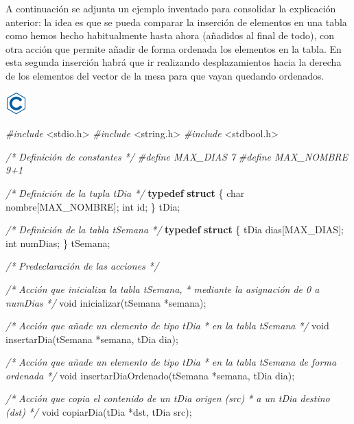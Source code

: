 \documentclass[
]{book}
\newenvironment{Shaded}{\begin{snugshade}}{\end{snugshade}}
\newcommand{\CommentTok}[1]{\textcolor[rgb]{0.56,0.35,0.01}{\textit{#1}}}
\newcommand{\DataTypeTok}[1]{\textcolor[rgb]{0.13,0.29,0.53}{#1}}
\newcommand{\ImportTok}[1]{#1}
\newcommand{\KeywordTok}[1]{\textcolor[rgb]{0.13,0.29,0.53}{\textbf{#1}}}
\newcommand{\NormalTok}[1]{#1}
\newcommand{\PreprocessorTok}[1]{\textcolor[rgb]{0.56,0.35,0.01}{\textit{#1}}}
\begin{document}
A continuación se adjunta un ejemplo inventado para consolidar la explicación anterior: la idea es que se pueda comparar la inserción de elementos en una tabla como hemos hecho habitualmente hasta ahora (añadidos al final de todo), con otra acción que permite añadir de forma ordenada los elementos en la tabla. En esta segunda inserción habrá que ir realizando desplazamientos hacia la derecha de los elementos del vector de la mesa para que vayan quedando ordenados.

\includegraphics{./img/c.png}

\begin{Shaded}
\begin{Highlighting}[]
\PreprocessorTok{\#include }\ImportTok{\textless{}stdio.h\textgreater{}}
\PreprocessorTok{\#include }\ImportTok{\textless{}string.h\textgreater{}}
\PreprocessorTok{\#include }\ImportTok{\textless{}stdbool.h\textgreater{}}

\CommentTok{/* Definición de constantes */}
\PreprocessorTok{\#define MAX\_DIAS 7}
\PreprocessorTok{\#define MAX\_NOMBRE 9+1}

\CommentTok{/* Definición de la tupla tDia */}
\KeywordTok{typedef} \KeywordTok{struct}\NormalTok{ \{}
    \DataTypeTok{char}\NormalTok{ nombre[MAX\_NOMBRE];}
    \DataTypeTok{int}\NormalTok{ id;}
\NormalTok{\} tDia;}

\CommentTok{/* Definición de la tabla tSemana */}
\KeywordTok{typedef} \KeywordTok{struct}\NormalTok{ \{}
\NormalTok{    tDia dias[MAX\_DIAS];}
    \DataTypeTok{int}\NormalTok{ numDias;}
\NormalTok{\} tSemana;}

\CommentTok{/* Predeclaración de las acciones */}

\CommentTok{/* Acción que inicializa la tabla tSemana,}
\CommentTok{ * mediante la asignación de 0 a numDias}
\CommentTok{ */}
\DataTypeTok{void}\NormalTok{ inicializar(tSemana *semana);}

\CommentTok{/* Acción que añade un elemento de tipo tDia}
\CommentTok{ * en la tabla tSemana}
\CommentTok{ */}
\DataTypeTok{void}\NormalTok{ insertarDia(tSemana *semana, tDia dia);}

\CommentTok{/* Acción que añade un elemento de tipo tDia}
\CommentTok{ * en la tabla tSemana de forma ordenada}
\CommentTok{ */}
\DataTypeTok{void}\NormalTok{ insertarDiaOrdenado(tSemana *semana, tDia dia);}

\CommentTok{/* Acción que copia el contenido de un tDia origen (src)}
\CommentTok{ * a un tDia destino (dst)}
\CommentTok{ */}
\DataTypeTok{void}\NormalTok{ copiarDia(tDia *dst, tDia src);}


\end{Highlighting}
\end{Shaded}
\end{document}
